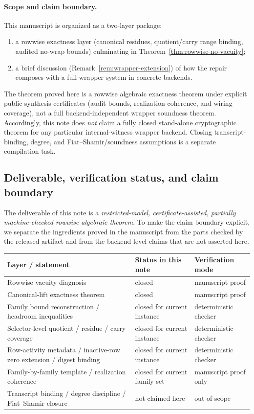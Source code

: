 ﻿\documentclass[11pt]{article}
\begin{document}
\paragraph{Scope and claim boundary.}
This manuscript is organized as a two-layer package:
\begin{enumerate}[label=(\roman*),leftmargin=2em]
    \item a rowwise exactness layer (canonical residues, quotient/carry range
    binding, audited no-wrap bounds) culminating in
    Theorem~\ref{thm:rowwise-no-vacuity};
    \item a brief discussion (Remark~\ref{rem:wrapper-extension}) of how the
    repair composes with a full wrapper system in concrete backends.
\end{enumerate}
The theorem proved here is a rowwise algebraic exactness theorem under explicit
public synthesis certificates (audit bounds, realization coherence, and wiring
coverage), not a full backend-independent wrapper soundness theorem.
Accordingly, this note does \emph{not} claim a fully closed stand-alone
cryptographic theorem for any particular internal-witness wrapper backend.
Closing transcript-binding, degree, and Fiat--Shamir/soundness assumptions is a
separate compilation task.

\subsection{Deliverable, verification status, and claim boundary}
\label{subsec:deliverable-status}

The deliverable of this note is a \emph{restricted-model, certificate-assisted,
partially machine-checked rowwise algebraic theorem}. To make the claim boundary
explicit, we separate the ingredients proved in the manuscript from the parts
checked by the released artifact and from the backend-level claims that are not
asserted here.

\begin{center}
\begin{tabular}{|l|l|l|}
\hline
Layer / statement & Status in this note & Verification mode \\
\hline
Rowwise vacuity diagnosis & closed & manuscript proof \\
\hline
Canonical-lift exactness theorem & closed & manuscript proof \\
\hline
Family bound reconstruction / headroom inequalities & closed for current instance & deterministic checker \\
\hline
Selector-level quotient / residue / carry coverage & closed for current instance & deterministic checker \\
\hline
Row-activity metadata / inactive-row zero extension / digest binding & closed for current instance & deterministic checker \\
\hline
Family-by-family template / realization coherence & closed for current family set & manuscript proof only \\
\hline
Transcript binding / degree discipline / Fiat--Shamir closure & not claimed here & out of scope \\
\hline
\end{tabular}
\end{center}
\end{document}
